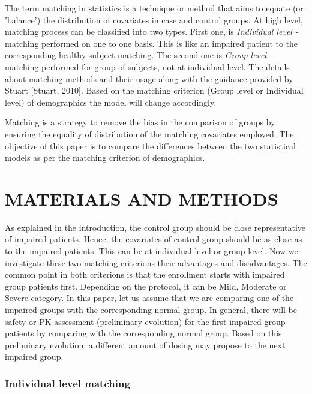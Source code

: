 \documentclass[final]{statistica}
\begin{document}
\vspace{3mm}
\par
The term matching in statistics is a technique or method that aims to equate (or 'balance') the distribution of covariates in case and control groups. At high level, matching process can be classified into two types. First one, is {\em Individual level -} matching performed on one to one basis. This is like an impaired patient to the corresponding healthy subject matching. The second one is {\em Group level -} matching performed for group of subjects, not at individual level. The details about matching methods and their usage along with the guidance provided by Stuart [Stuart, 2010]. Based on the matching criterion (Group level or Individual level) of demographics the model will change accordingly.
\vspace{3mm}
\par
Matching is a strategy to remove the bias in the comparison of groups by ensuring the equality of distribution of the matching covariates employed. The objective of this paper is to compare the differences between the two statistical models as per the matching criterion of demographics.

\section{MATERIALS AND METHODS}

As explained in the introduction, the control group should be close representative of impaired patients. Hence, the covariates of control group should be as close as to the impaired patients. This can be at individual level or group level. Now we investigate these two matching criterions their advantages and disadvantages. The common point in both criterions is that the enrollment starts with impaired group patients first. Depending on the protocol, it can be Mild, Moderate or Severe category. In this paper, let us assume that we are comparing one of the impaired groups with the corresponding normal group. In general, there will be safety or PK assessment (preliminary evolution) for the first impaired group patients by comparing with the corresponding normal group. Based on this preliminary evolution, a different amount of dosing may propose to the next impaired group.

\subsubsection{Individual level matching}
\end{document}

